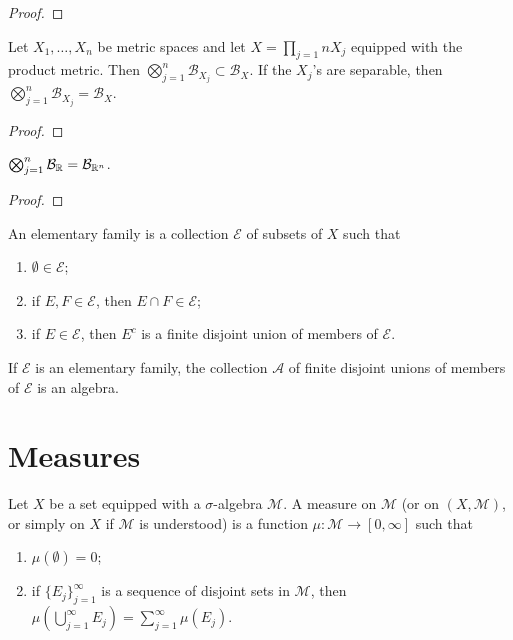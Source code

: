 \begin{proof}

\end{proof}

\begin{proposition}
    Let $X_1, \dots, X_n$ be metric spaces and let $X = \prod_{j=1}{n} X_j$ equipped with the product metric.
    Then $\bigotimes_{j=1}^{n} \mathcal{B}_{X_j} \subset \mathcal{B}_{X}$.
    If the $X_j$'s are separable, then $\bigotimes_{j=1}^{n} \mathcal{B}_{X_j} = \mathcal{B}_{X}$.
\end{proposition}

\begin{proof}

\end{proof}

\begin{corollary}
    $\bigotimes_{j=1}^{n} \mathcal{B}_{\mathbb{R}} = \mathcal{B}_{\mathbb{R}^n}$.
\end{corollary}

\begin{proof}

\end{proof}

\begin{definition}
    An elementary family is a collection $\mathcal{E}$ of subsets of $X$ such that
    \begin{enumerate}
        \item $\emptyset \in \mathcal{E}$;
        \item if $E, F \in \mathcal{E}$, then $E \cap F \in \mathcal{E}$;
        \item if $E \in \mathcal{E}$, then $E^c$ is a finite disjoint union of members of $\mathcal{E}$.
    \end{enumerate}
\end{definition}

\begin{proposition}
    If $\mathcal{E}$ is an elementary family, the collection $\mathcal{A}$ of finite disjoint unions of members of $\mathcal{E}$ is an algebra.
\end{proposition}

\section{Measures}

\begin{definition}[Measure]
    Let $X$ be a set equipped with a $\sigma$-algebra $\mathcal{M}$.
    A measure on $\mathcal{M}$ (or on $(X, \mathcal{M})$, or simply on $X$ if $\mathcal{M}$ is understood) is a function $\mu: \mathcal{M} \to [0, \infty]$ such that
    \begin{enumerate}
        \item $\mu(\emptyset) = 0$;
        \item if $\{ E_j \}_{j=1}^{\infty}$ is a sequence of disjoint sets in $\mathcal{M}$, then $\mu(\bigcup_{j=1}^{\infty} E_j) = \sum _{j=1}^{\infty} \mu(E_j)$.
    \end{enumerate}
\end{definition}

